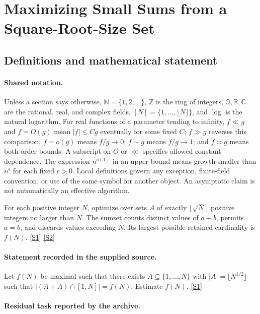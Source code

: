\documentclass[11pt,a4paper]{article}
\newcommand{\N}{\mathbb{N}}
\newcommand{\Z}{\mathbb{Z}}
\newcommand{\Q}{\mathbb{Q}}
\newcommand{\R}{\mathbb{R}}
\newcommand{\C}{\mathbb{C}}
\newcommand{\sref}[2]{\hyperlink{source:#1:#2}{[S#2]}}
\begin{document}
\section{Maximizing Small Sums from a Square-Root-Size Set}\label{statement}


\subsection{Definitions and mathematical statement}

\paragraph{Shared notation.}Unless a section says otherwise, $\N=\{1,2,\ldots\}$,
$\Z$ is the ring of integers, $\Q,\R,\C$ are the rational, real, and complex
fields, $[N]=\{1,\ldots,\lfloor N\rfloor\}$, and $\log$ is the natural
logarithm. For real functions of a parameter tending to infinity,
$f\ll g$ and $f=O(g)$ mean $|f|\leq Cg$ eventually for some fixed $C$;
$f\gg g$ reverses this comparison; $f=o(g)$ means $f/g\to0$;
$f\sim g$ means $f/g\to1$; and $f\asymp g$ means both order bounds.
A subscript on $O$ or $\ll$ specifies allowed constant dependence.
The expression $n^{o(1)}$ in an upper bound means growth smaller than
$n^\epsilon$ for each fixed $\epsilon>0$. Local definitions govern any
exception, finite-field convention, or use of the same symbol for another
object. An asymptotic claim is not automatically an effective algorithm.



For each positive integer $N$, optimize over sets $A$ of exactly $\lfloor\sqrt N\rfloor$ positive integers no larger than $N$. The sumset counts distinct values of $a+b$, permits $a=b$, and discards values exceeding $N$. Its largest possible retained cardinality is $f(N)$. \sref{statement}{1} \sref{statement}{2}

\paragraph{Statement recorded in the supplied source.}
Let $f(N)$ be maximal such that there exists $A\subseteq \{1,\ldots,N\}$ with $\lvert A\rvert=\lfloor N^{1/2}\rfloor$ such that $\lvert (A+A)\cap [1,N]\rvert=f(N)$. Estimate $f(N)$. \sref{statement}{1}

\paragraph{Residual task reported by the archive.}
\end{document}
